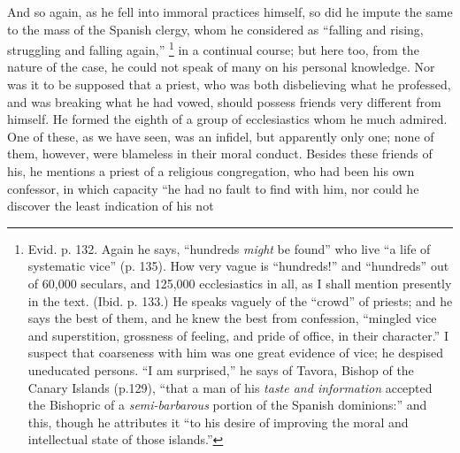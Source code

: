 And so again, as he fell into immoral practices
himself, so did he impute the same to the mass of the
Spanish clergy, whom he considered as ``falling and
rising, struggling and falling again,'' \footnote{Evid. p. 132. Again he says,
``hundreds \emph{might} be found'' who live ``a life
of systematic vice'' (p. 135). How very vague is
``hundreds!'' and ``hundreds'' out of
60,000 seculars, and 125,000 ecclesiastics in all, as I
shall mention presently in the text. (Ibid. p. 133.) He
speaks vaguely of the ``crowd'' of priests; and
he says the best of them, and he knew the best from
confession, ``mingled vice and superstition,
grossness of feeling, and pride of office, in their
character.'' I suspect that coarseness with him was
one great evidence of vice; he despised uneducated
persons. ``I am surprised,'' he says of Tavora,
Bishop of the Canary Islands (p.129), ``that a man of
his \emph{taste and information} accepted the Bishopric
of a \emph{semi-barbarous} portion of the Spanish
dominions:'' and this, though he attributes it
``to his desire of improving the moral and
intellectual state of those islands.''} in a
continual course; but here too, from the nature of the
case, he could not speak of many on his personal
knowledge. Nor was it to be supposed that a priest, who
was both disbelieving what he professed, and was breaking
what he had vowed, should possess friends very different
from himself. He formed the eighth of a group of
ecclesiastics whom he much admired. One of these, as we
have seen, was an infidel, but apparently only one; none
of them, however, were blameless in their moral conduct.
Besides these friends of his, he mentions a priest of a
religious congregation, who had been his own confessor,
in which capacity ``he had no fault to find with him,
nor could he discover the least indication of his not
